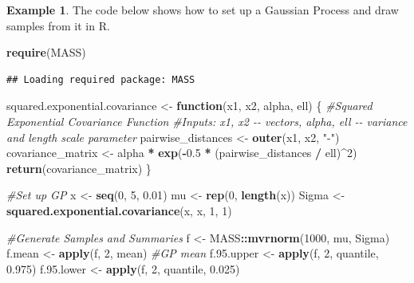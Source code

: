 \documentclass[
]{book}
\newenvironment{Shaded}{\begin{snugshade}}{\end{snugshade}}
\newcommand{\CommentTok}[1]{\textcolor[rgb]{0.56,0.35,0.01}{\textit{#1}}}
\newcommand{\ControlFlowTok}[1]{\textcolor[rgb]{0.13,0.29,0.53}{\textbf{#1}}}
\newcommand{\DecValTok}[1]{\textcolor[rgb]{0.00,0.00,0.81}{#1}}
\newcommand{\FloatTok}[1]{\textcolor[rgb]{0.00,0.00,0.81}{#1}}
\newcommand{\FunctionTok}[1]{\textcolor[rgb]{0.13,0.29,0.53}{\textbf{#1}}}
\newcommand{\NormalTok}[1]{#1}
\newcommand{\OtherTok}[1]{\textcolor[rgb]{0.56,0.35,0.01}{#1}}
\newcommand{\SpecialCharTok}[1]{\textcolor[rgb]{0.81,0.36,0.00}{\textbf{#1}}}
\newcommand{\StringTok}[1]{\textcolor[rgb]{0.31,0.60,0.02}{#1}}
\theoremstyle{definition}
\theoremstyle{definition}
\newtheorem{example}{Example}[chapter]
\theoremstyle{definition}
\theoremstyle{definition}
\theoremstyle{remark}
\begin{document}
\begin{example}
The code below shows how to set up a Gaussian Process and draw samples from it in R.

\begin{Shaded}
\begin{Highlighting}[]
\FunctionTok{require}\NormalTok{(MASS)}
\end{Highlighting}
\end{Shaded}

\begin{verbatim}
## Loading required package: MASS
\end{verbatim}

\begin{Shaded}
\begin{Highlighting}[]
\NormalTok{squared.exponential.covariance }\OtherTok{\textless{}{-}} \ControlFlowTok{function}\NormalTok{(x1, x2, alpha, ell) \{}
  \CommentTok{\#Squared Exponential Covariance Function}
  \CommentTok{\#Inputs: x1, x2 {-}{-} vectors, alpha, ell {-}{-} variance and length scale parameter}
\NormalTok{  pairwise\_distances }\OtherTok{\textless{}{-}} \FunctionTok{outer}\NormalTok{(x1, x2, }\StringTok{"{-}"}\NormalTok{)}
\NormalTok{  covariance\_matrix }\OtherTok{\textless{}{-}}\NormalTok{ alpha }\SpecialCharTok{*} \FunctionTok{exp}\NormalTok{(}\SpecialCharTok{{-}}\FloatTok{0.5} \SpecialCharTok{*}\NormalTok{ (pairwise\_distances }\SpecialCharTok{/}\NormalTok{ ell)}\SpecialCharTok{\^{}}\DecValTok{2}\NormalTok{)}
  \FunctionTok{return}\NormalTok{(covariance\_matrix)}
\NormalTok{\}}

\CommentTok{\#Set up GP}
\NormalTok{x }\OtherTok{\textless{}{-}} \FunctionTok{seq}\NormalTok{(}\DecValTok{0}\NormalTok{, }\DecValTok{5}\NormalTok{, }\FloatTok{0.01}\NormalTok{)}
\NormalTok{mu }\OtherTok{\textless{}{-}} \FunctionTok{rep}\NormalTok{(}\DecValTok{0}\NormalTok{, }\FunctionTok{length}\NormalTok{(x))}
\NormalTok{Sigma }\OtherTok{\textless{}{-}} \FunctionTok{squared.exponential.covariance}\NormalTok{(x, x, }\DecValTok{1}\NormalTok{, }\DecValTok{1}\NormalTok{)}

\CommentTok{\#Generate Samples and Summaries}
\NormalTok{f }\OtherTok{\textless{}{-}}\NormalTok{ MASS}\SpecialCharTok{::}\FunctionTok{mvrnorm}\NormalTok{(}\DecValTok{1000}\NormalTok{, mu, Sigma)}
\NormalTok{f.mean }\OtherTok{\textless{}{-}} \FunctionTok{apply}\NormalTok{(f, }\DecValTok{2}\NormalTok{, mean) }\CommentTok{\#GP mean}
\NormalTok{f.}\FloatTok{95.}\NormalTok{upper }\OtherTok{\textless{}{-}} \FunctionTok{apply}\NormalTok{(f, }\DecValTok{2}\NormalTok{, quantile, }\FloatTok{0.975}\NormalTok{)}
\NormalTok{f.}\FloatTok{95.}\NormalTok{lower }\OtherTok{\textless{}{-}} \FunctionTok{apply}\NormalTok{(f, }\DecValTok{2}\NormalTok{, quantile, }\FloatTok{0.025}\NormalTok{)}


\end{Highlighting}
\end{Shaded}
\end{example}
\end{document}
